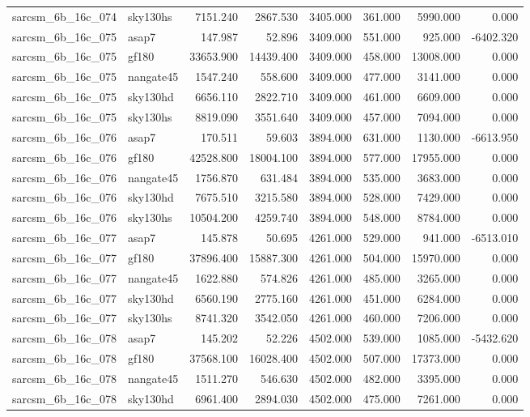 \begin{tabular}{llrrrrrr}
sarcsm\_6b\_16c\_074 & sky130hs & 7151.240 & 2867.530 & 3405.000 & 361.000 & 5990.000 & 0.000 \\
sarcsm\_6b\_16c\_075 & asap7 & 147.987 & 52.896 & 3409.000 & 551.000 & 925.000 & -6402.320 \\
sarcsm\_6b\_16c\_075 & gf180 & 33653.900 & 14439.400 & 3409.000 & 458.000 & 13008.000 & 0.000 \\
sarcsm\_6b\_16c\_075 & nangate45 & 1547.240 & 558.600 & 3409.000 & 477.000 & 3141.000 & 0.000 \\
sarcsm\_6b\_16c\_075 & sky130hd & 6656.110 & 2822.710 & 3409.000 & 461.000 & 6609.000 & 0.000 \\
sarcsm\_6b\_16c\_075 & sky130hs & 8819.090 & 3551.640 & 3409.000 & 457.000 & 7094.000 & 0.000 \\
sarcsm\_6b\_16c\_076 & asap7 & 170.511 & 59.603 & 3894.000 & 631.000 & 1130.000 & -6613.950 \\
sarcsm\_6b\_16c\_076 & gf180 & 42528.800 & 18004.100 & 3894.000 & 577.000 & 17955.000 & 0.000 \\
sarcsm\_6b\_16c\_076 & nangate45 & 1756.870 & 631.484 & 3894.000 & 535.000 & 3683.000 & 0.000 \\
sarcsm\_6b\_16c\_076 & sky130hd & 7675.510 & 3215.580 & 3894.000 & 528.000 & 7429.000 & 0.000 \\
sarcsm\_6b\_16c\_076 & sky130hs & 10504.200 & 4259.740 & 3894.000 & 548.000 & 8784.000 & 0.000 \\
sarcsm\_6b\_16c\_077 & asap7 & 145.878 & 50.695 & 4261.000 & 529.000 & 941.000 & -6513.010 \\
sarcsm\_6b\_16c\_077 & gf180 & 37896.400 & 15887.300 & 4261.000 & 504.000 & 15970.000 & 0.000 \\
sarcsm\_6b\_16c\_077 & nangate45 & 1622.880 & 574.826 & 4261.000 & 485.000 & 3265.000 & 0.000 \\
sarcsm\_6b\_16c\_077 & sky130hd & 6560.190 & 2775.160 & 4261.000 & 451.000 & 6284.000 & 0.000 \\
sarcsm\_6b\_16c\_077 & sky130hs & 8741.320 & 3542.050 & 4261.000 & 460.000 & 7206.000 & 0.000 \\
sarcsm\_6b\_16c\_078 & asap7 & 145.202 & 52.226 & 4502.000 & 539.000 & 1085.000 & -5432.620 \\
sarcsm\_6b\_16c\_078 & gf180 & 37568.100 & 16028.400 & 4502.000 & 507.000 & 17373.000 & 0.000 \\
sarcsm\_6b\_16c\_078 & nangate45 & 1511.270 & 546.630 & 4502.000 & 482.000 & 3395.000 & 0.000 \\
sarcsm\_6b\_16c\_078 & sky130hd & 6961.400 & 2894.030 & 4502.000 & 475.000 & 7261.000 & 0.000 \\

\end{tabular}

